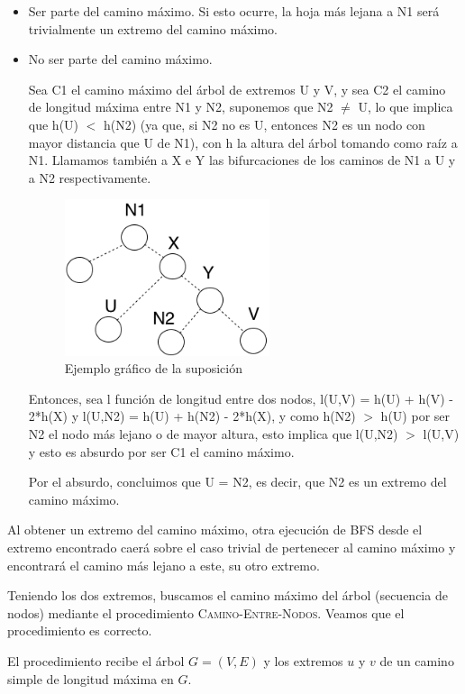 \documentclass[a4paper, 10pt, twoside]{article}
\begin{document}
\begin{itemize}
  \item Ser parte del camino máximo. Si esto ocurre, la hoja más lejana a N1 será trivialmente un extremo del camino máximo.
  \item No ser parte del camino máximo.
  
  Sea C1 el camino máximo del árbol de extremos U y V, y sea C2 el camino de longitud máxima entre N1 y N2, suponemos que N2 $\neq$ U, lo que implica que h(U) $<$ h(N2) (ya que, si N2 no es U, entonces N2 es un nodo con mayor distancia que U de N1), con h la altura del árbol tomando como raíz a N1. Llamamos también a X e Y las bifurcaciones de los caminos de N1 a U y a N2 respectivamente.

    \begin{figure}[ht!]
    \centering
    \includegraphics[width=60mm]{2b.png}
    \caption{Ejemplo gráfico de la suposición}
    \label{overflow}
    \end{figure}  

   Entonces, sea l función de longitud entre dos nodos, l(U,V) = h(U) + h(V) - 2*h(X) y l(U,N2) = h(U) + h(N2) - 2*h(X), y como h(N2) $>$ h(U) por ser N2 el nodo más lejano o de mayor altura, esto implica que l(U,N2) $>$ l(U,V) y esto es absurdo por ser C1 el camino máximo.
  
  Por el absurdo, concluimos que U = N2, es decir, que N2 es un extremo del camino máximo.
\end{itemize}

Al obtener un extremo del camino máximo, otra ejecución de BFS desde el extremo encontrado caerá sobre el caso trivial de pertenecer al camino máximo y encontrará el camino más lejano a este, su otro extremo.

Teniendo los dos extremos, buscamos el camino máximo del árbol (secuencia de nodos) mediante el procedimiento \textsc{Camino-Entre-Nodos}. Veamos que el procedimiento es correcto.

El procedimiento recibe el árbol $G = (V, E)$ y los extremos $u$ y $v$ de un camino simple de longitud máxima en $G$.
\end{document}

